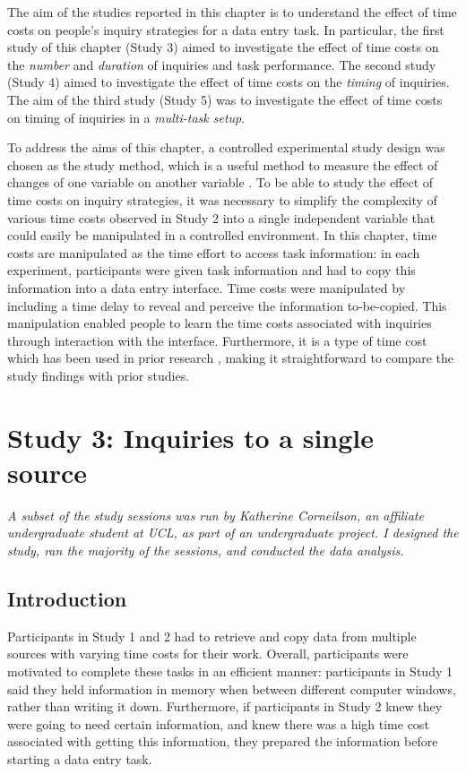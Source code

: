 The aim of the studies reported in this chapter is to understand the effect of time costs on people's inquiry strategies for a data entry task. In particular, the first study of this chapter (Study 3) aimed to investigate the effect of time costs on the \textit{number} and \textit{duration} of inquiries and task performance. The second study (Study 4) aimed to investigate the effect of time costs on the \textit{timing} of inquiries. The aim of the third study (Study 5) was to investigate the effect of time costs on timing of inquiries in a \textit{multi-task setup}.

To address the aims of this chapter, a controlled experimental study design was chosen as the study method, which is a useful method to measure the effect of changes of one variable on another variable \citep{Cairns2008}. To be able to study the effect of time costs on inquiry strategies, it was necessary to simplify the complexity of various time costs observed in Study 2 into a single independent variable that could easily be manipulated in a controlled environment. In this chapter, time costs are manipulated as the time effort to access task information: in each experiment, participants were given task information and had to copy this information into a data entry interface. Time costs were manipulated by including a time delay to reveal and perceive the information to-be-copied. This manipulation enabled people to learn the time costs associated with inquiries through interaction with the interface. Furthermore, it is a type of time cost which has been used in prior research \citep[e.g.][]{Gray2006, Morgan2009}, making it straightforward to compare the study findings with prior studies.

\section{Study 3: Inquiries to a single source}\label{st:Study3}

\textit{A subset of the study sessions was run by Katherine Corneilson, an affiliate undergraduate student at UCL, as part of an undergraduate project. I designed the study, ran the majority of the sessions, and conducted the data analysis.}

\subsection{Introduction}
Participants in Study 1 and 2 had to retrieve and copy data from multiple sources with varying time costs for their work. Overall, participants were motivated to complete these tasks in an efficient manner: participants in Study 1 said they held information in memory when between different computer windows, rather than writing it down. Furthermore, if participants in Study 2 knew they were going to need certain information, and knew there was a high time cost associated with getting this information, they prepared the information before starting a data entry task. 

